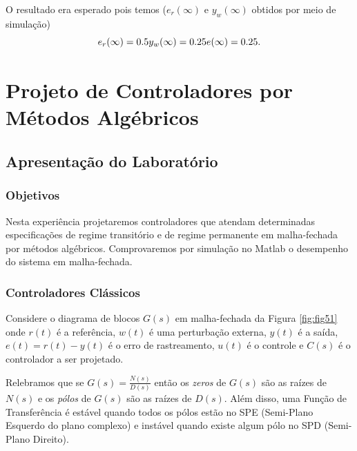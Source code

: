 \documentclass[
]{book}
\begin{document}
O resultado era esperado pois temos (\(e_r(\infty)\) e \(y_w(\infty)\) obtidos por meio de simulação)
\[
e_r(\infty) = 0.5 \\
y_w(\infty) = 0.25 \\
e(\infty) = 0.25.
\]

\hypertarget{projeto-de-controladores-por-muxe9todos-alguxe9bricos}{%
\chapter{Projeto de Controladores por Métodos Algébricos}\label{projeto-de-controladores-por-muxe9todos-alguxe9bricos}}

\hypertarget{apresentauxe7uxe3o-do-laboratuxf3rio-3}{%
\section{Apresentação do Laboratório}\label{apresentauxe7uxe3o-do-laboratuxf3rio-3}}

\hypertarget{objetivos-1}{%
\subsection{Objetivos}\label{objetivos-1}}

Nesta experiência projetaremos controladores que atendam determinadas especificações de regime transitório e de regime permanente em malha-fechada por métodos algébricos. Comprovaremos por simulação no Matlab o desempenho do sistema em malha-fechada.

\hypertarget{controladores-cluxe1ssicos}{%
\subsection{Controladores Clássicos}\label{controladores-cluxe1ssicos}}

Considere o diagrama de blocos \(G(s)\) em malha-fechada da Figura \ref{fig:fig51} onde \(r(t)\) é a referência, \(w(t)\) é uma perturbação externa, \(y(t)\) é a saída, \(e(t) = r(t) - y(t)\) é o erro de rastreamento, \(u(t)\) é o controle e \(C(s)\) é o controlador a ser projetado.

Relebramos que se \(G(s) = \frac {N(s)}{D(s)}\) então os \emph{zeros} de \(G(s)\) são as raízes de \(N(s)\) e os \emph{pólos} de \(G(s)\) são as raízes de \(D(s)\). Além disso, uma Função de Transferência é estável quando todos os pólos estão no SPE (Semi-Plano Esquerdo do plano complexo) e instável quando existe algum pólo no SPD (Semi-Plano Direito).
\end{document}
